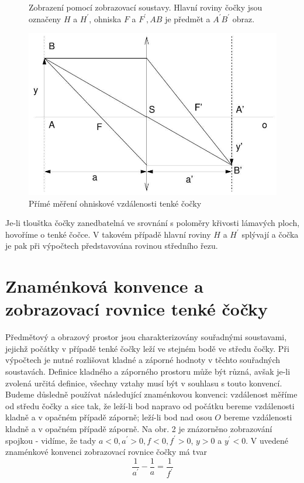 \documentclass[czech,11pt,a4paper]{article}
\begin{document}
\begin{multicols}{2}
\begin{figure}[H]
	
	\caption{Zobrazení pomocí zobrazovací soustavy. Hlavní roviny čočky jsou označeny $H$ a $H^{\prime}$, ohniska $F$ a $F^{\prime}, A B$ je předmět a $A^{\prime} B^{\prime}$ obraz.\\
	}

		\includegraphics[max width=0.95\linewidth,center]{2024_12_03_2b013636ff75d184213cg-2}
		\caption{Přímé měření ohniskové vzdálenosti tenké čočky}
\end{figure}

Je-li tlouštka čočky zanedbatelná ve srovnání s poloměry křivosti lámavých ploch, hovoříme o tenké čočce. V takovém případě hlavní roviny $H$ a $H^{\prime}$ splývají a čočka je pak při výpočtech představována rovinou středního řezu.

\section{Znaménková konvence a zobrazovací rovnice tenké čočky}

Předmětový a obrazový prostor jsou charakterizovány souřadnými soustavami, jejichž počátky v případě tenké čočky leží ve stejném bodě ve středu čočky. Při výpočtech je nutné rozlišovat kladné a záporné hodnoty v těchto souřadných soustavách. Definice kladného a záporného prostoru může být různá, avšak je-li zvolená určitá definice, všechny vztahy musí být v souhlasu s touto konvencí. Budeme důsledně používat následující znaménkovou konvenci: vzdálenost měříme od středu čočky a sice tak, že leží-li bod napravo od počátku bereme vzdálenosti kladně a v opačném případě záporně; leží-li bod nad osou $O$ bereme vzdálenosti kladně a v opačném případě záporně. Na obr. 2 je znázorněno zobrazování spojkou - vidíme, že tady $a<0, a^{\prime}>0, f<0, f^{\prime}>0$, $y>0$ a $y^{\prime}<0$. V uvedené znaménkové konvenci zobrazovací rovnice čočky má tvar
\begin{equation}
	\frac{1}{a^{\prime}}-\frac{1}{a}=\frac{1}{f^{\prime}}
\end{equation}


\end{multicols}
\end{document}
